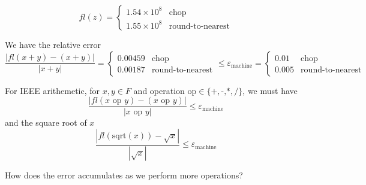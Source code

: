 \begin{example}[Cont.]
    \[
        fl(z) = \begin{cases}
            1.54 \times 10^8 & \text{chop}             \\
            1.55 \times 10^8 & \text{round-to-nearest}
        \end{cases}
    \]

    We have the relative error \[
        \frac{|fl(x+y) - (x+y)|}{|x+y|} = \begin{cases}
            0.00459 & \text{chop}             \\
            0.00187 & \text{round-to-nearest}
        \end{cases} \leq \varepsilon_{\text{machine}} = \begin{cases}
            0.01  & \text{chop}             \\
            0.005 & \text{round-to-nearest}
        \end{cases}
    \]
\end{example}

\begin{remark}
    For IEEE arithemetic, for \( x, y \in F \) and operation \( \text{op} \in \{ \texttt{+}, \texttt{-,} \texttt{*}, \texttt{/} \} \), we must have \[
        \frac{|fl(x \text{ op } y) -  (x \text{ op } y)|}{|x \text{ op } y|} \leq \varepsilon_{\text{machine}}
    \] and the square root of \( x \) \[
        \frac{|fl(\text{sqrt}(x)) - \sqrt{x}|}{|\sqrt{x}|} \leq \varepsilon_{\text{machine}}
    \]
\end{remark}

How does the error accumulates as we perform more operations?


